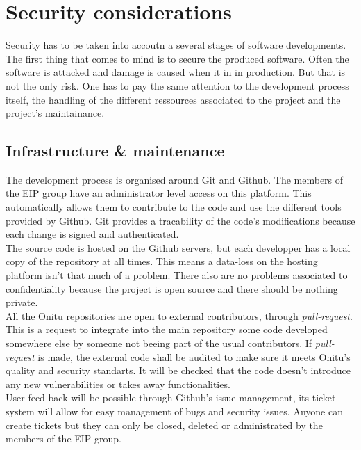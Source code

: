 \section{Security considerations}

Security has to be taken into accoutn a several stages of software developments. The first thing that comes to mind is to secure the produced software. Often the software is attacked and damage is caused when it in in production. But that is not the only risk. One has to pay the same attention to the development process itself, the handling of the different ressources associated to the project and the project's maintainance.

\subsection{Infrastructure \& maintenance}

The development process is organised around Git and Github. The members of the EIP group have an administrator level access on this platform. This automatically allows them to contribute to the code and use the different tools provided by Github. Git provides a tracability of the code's modifications because each change is signed and authenticated.\\

The source code is hosted on the Github servers, but each developper has a local copy of the repository at all times. This means a data-loss on the hosting platform isn't that much of a problem. There also are no problems associated to confidentiality because the project is open source and there should be nothing private.\\

All the Onitu repositories are open to external contributors, through \textit{pull-request}. This is a request to integrate into the main repository some code developed somewhere else by someone not beeing part of the usual contributors. If \textit{pull-request} is made, the external code shall be audited to make sure it meets Onitu's quality and security standarts. It will be checked that the code doesn't introduce any new vulnerabilities or takes away functionalities.\\

User feed-back will be possible through Github's issue management, its ticket system will allow for easy management of bugs and security issues. Anyone can create tickets but they can only be closed, deleted or administrated by the members of the EIP group.

